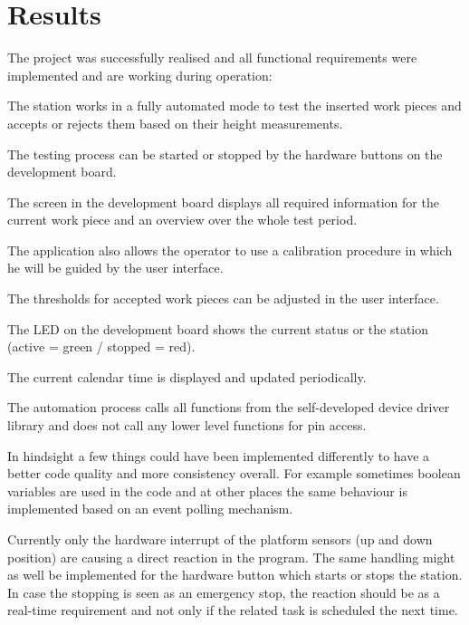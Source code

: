 \chapter{Results} \label{ch:results}%

The project was successfully realised and all functional requirements were implemented and are working during operation:

\begin{list}{\makebox[0pt][l]{$\square$}\raisebox{.15ex}{\hspace{0.1em}$\checkmark$}}
	\item The station works in a fully automated mode to test the inserted work pieces and accepts or rejects them based on their height measurements.
	\item %
	\item The testing process can be started or stopped by the hardware buttons on the development board.
	\item The screen in the development board displays all required information for the current work piece and an overview over the whole test period.
	\item The application also allows the operator to use a calibration procedure in which he will be guided by the user interface.
	\item The thresholds for accepted work pieces can be adjusted in the user interface.
	\item The LED on the development board shows the current status or the station (active = green / stopped = red).
	\item The current calendar time is displayed and updated periodically.
	\item The automation process calls all functions from the self-developed device driver library and does not call any lower level functions for pin access.
\end{list}

In hindsight a few things could have been implemented differently to have a better code quality and more consistency overall. For example sometimes boolean variables are used in the code and at other places the same behaviour is implemented based on an event polling mechanism. 

Currently only the hardware interrupt of the platform sensors (up and down position) are causing a direct reaction in the program. The same handling might as well be implemented for the hardware button which starts or stops the station. In case the stopping is seen as an emergency stop, the reaction should be as a real-time requirement and not only if the related task is scheduled the next time. 

